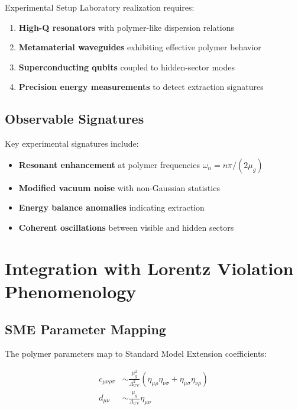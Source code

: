 \documentclass[12pt]{article}
\begin{document}
\begin{warningbox}{Experimental Setup}
Laboratory realization requires:

\begin{enumerate}
\item \textbf{High-Q resonators} with polymer-like dispersion relations
\item \textbf{Metamaterial waveguides} exhibiting effective polymer behavior  
\item \textbf{Superconducting qubits} coupled to hidden-sector modes
\item \textbf{Precision energy measurements} to detect extraction signatures
\end{enumerate}
\end{warningbox}

\subsection{Observable Signatures}

Key experimental signatures include:

\begin{itemize}
\item \textbf{Resonant enhancement} at polymer frequencies $\omega_n = n\pi/(2\mu_g)$
\item \textbf{Modified vacuum noise} with non-Gaussian statistics
\item \textbf{Energy balance anomalies} indicating extraction
\item \textbf{Coherent oscillations} between visible and hidden sectors
\end{itemize}

\section{Integration with Lorentz Violation Phenomenology}

\subsection{SME Parameter Mapping}

The polymer parameters map to Standard Model Extension coefficients:

\begin{align}
c_{\mu\nu\rho\sigma} &\sim \frac{\mu_g^2}{\Lambda_{\text{UV}}^2} \left( \eta_{\mu\rho} \eta_{\nu\sigma} + \eta_{\mu\sigma} \eta_{\nu\rho} \right) \\
d_{\mu\nu} &\sim \frac{\mu_g}{\Lambda_{\text{UV}}} \eta_{\mu\nu}
\end{align}
\end{document}
